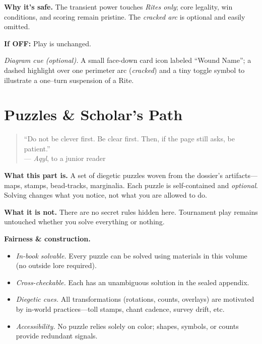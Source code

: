 \documentclass[11pt]{article}
\begin{document}
\medskip
\noindent\textbf{Why it’s safe.} The transient power touches \emph{Rites only}; core legality, win conditions, and scoring remain pristine. The \emph{cracked arc} is optional and easily omitted.

\medskip
\noindent\textbf{If \textsc{OFF}:} Play is unchanged.

\medskip
\noindent\textit{Diagram cue (optional).} A small face-down card icon labeled “Wound Name”; a dashed highlight over one perimeter arc (\emph{cracked}) and a tiny toggle symbol to illustrate a one–turn suspension of a Rite.

\clearpage



\section{Puzzles \& Scholar’s Path}
\label{part:puzzles}

\begin{quote}\small
“Do not be clever first. Be clear first. Then, if the page still asks, be patient.”\\
\hfill — \textit{Aqyl}, to a junior reader
\end{quote}

\noindent\textbf{What this part is.} A set of diegetic puzzles woven from the dossier’s artifacts—maps, stamps, bead-tracks, marginalia. Each puzzle is self-contained and \emph{optional}. Solving changes what you notice, not what you are allowed to do.

\medskip
\noindent\textbf{What it is not.} There are no secret rules hidden here. Tournament play remains untouched whether you solve everything or nothing.

\medskip
\noindent\textbf{Fairness \& construction.}
\begin{itemize}\setlength\itemsep{0.3em}
  \item \emph{In-book solvable.} Every puzzle can be solved using materials in this volume (no outside lore required).
  \item \emph{Cross-checkable.} Each has an unambiguous solution in the sealed appendix.
  \item \emph{Diegetic cues.} All transformations (rotations, counts, overlays) are motivated by in-world practices—toll stamps, chant cadence, survey drift, etc.
  \item \emph{Accessibility.} No puzzle relies solely on color; shapes, symbols, or counts provide redundant signals.
\end{itemize}
\end{document}
